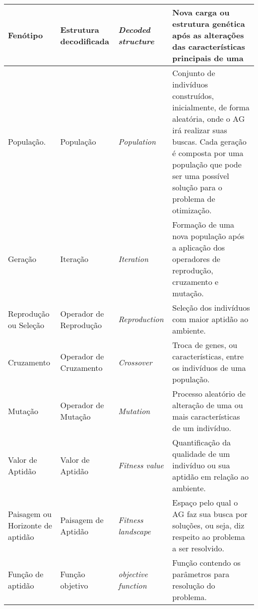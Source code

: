 \documentclass[a4paper,12pt,openright,oneside]{book}
\begin{document}
\begin{appendices}
\begin{table}[h!]
\begin{tabular}{ | >{\centering\arraybackslash}m{} | >{\centering\arraybackslash}m{} | >{\centering\arraybackslash}m{} | >{\centering\arraybackslash}m{} | }
        Fenótipo                           &   Estrutura decodificada             &   \textit{Decoded structure}                  & Nova carga ou estrutura genética após as alterações das características principais de uma \\ \hline
        População.                         &   População                          &   \textit{Population}                         & Conjunto de indivíduos construídos, inicialmente, de forma aleatória, onde o AG irá realizar suas buscas. Cada geração é composta por uma população que pode ser uma possível solução para o problema de otimização.                                                                                                   \\ \hline                           Geração                            &   Iteração                           &   \textit{Iteration}                          & Formação de uma nova população após a aplicação dos operadores de reprodução, cruzamento e mutação. \\ \hline 
        Reprodução ou Seleção              &   Operador de Reprodução             &   \textit{Reproduction}                       & Seleção dos indivíduos com maior aptidão ao ambiente. \\ \hline 
        Cruzamento                         &   Operador de Cruzamento             &   \textit{Crossover}                          & Troca de genes, ou características, entre os indivíduos de uma população. \\ \hline 
        Mutação                            &   Operador de Mutação                &   \textit{Mutation}                           & Processo aleatório de alteração de uma ou mais características de um indivíduo. \\ \hline 
        Valor de Aptidão                   &   Valor de Aptidão                   &   \textit{Fitness value}                      & Quantificação da qualidade de um indivíduo ou sua aptidão em relação ao ambiente. \\ \hline
        Paisagem ou Horizonte de aptidão   &   Paisagem de Aptidão                &   \textit{Fitness landscape}                  & Espaço pelo qual o AG faz sua busca por soluções, ou seja, diz respeito ao problema a ser resolvido. \\ \hline
        Função de aptidão                  &   Função objetivo                    &   \textit{objective function}                 & Função contendo os parâmetros para resolução do problema.
\end{tabular}
\\
\begin{minipage}{1 \textwidth}
\end{minipage}
\end{table}
\label{appx:TerminologiaNaturalComputacional}


\end{appendices}
\end{document}
